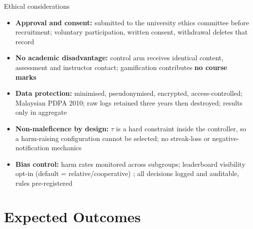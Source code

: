 \documentclass[10pt]{beamer}
\begin{document}
\begin{frame}{Ethical considerations}
\begin{itemize}
    \item \textbf{Approval and consent:} submitted to the university ethics committee before
    recruitment; voluntary participation, written consent, withdrawal deletes that record
    \item \textbf{No academic disadvantage:} control arm receives identical content,
    assessment and instructor contact; gamification contributes \textbf{no course marks}
    \item \textbf{Data protection:} minimised, pseudonymised, encrypted, access-controlled;
    Malaysian PDPA 2010; raw logs retained three years then destroyed; results only in aggregate
    \item \textbf{Non-maleficence by design:} $\tau$ is a hard constraint inside the controller,
    so a harm-raising configuration cannot be selected; no streak-loss or negative-notification
    mechanics \cite{gul2026brainrot}
    \item \textbf{Bias control:} harm rates monitored across subgroups; leaderboard visibility
    opt-in (default = relative/cooperative) \cite{edwards2022anxiety}; all decisions logged and
    auditable, rules pre-registered
\end{itemize}
\end{frame}


\section{Expected Outcomes}
\end{document}
